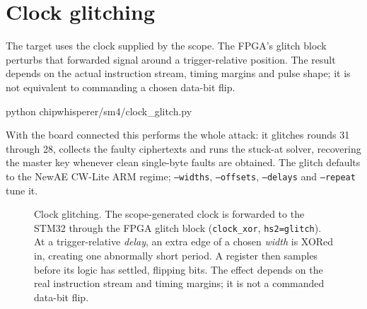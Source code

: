 \section{Clock glitching}
The target uses the clock supplied by the scope. The FPGA's glitch block perturbs that forwarded signal around a trigger-relative position. The result depends on the actual instruction stream, timing margins and pulse shape; it is not equivalent to commanding a chosen data-bit flip.
\begin{lightcode}
python chipwhisperer/sm4/clock_glitch.py
\end{lightcode}
With the board connected this performs the whole attack: it glitches rounds 31 through 28, collects the faulty ciphertexts and runs the stuck-at solver, recovering the master key whenever clean single-byte faults are obtained. The glitch defaults to the NewAE CW-Lite ARM regime; \texttt{--widths}, \texttt{--offsets}, \texttt{--delays} and \texttt{--repeat} tune it.

\begin{figure}[H]\centering
{}
\caption{Clock glitching. The scope-generated clock is forwarded to the STM32
through the FPGA glitch block (\texttt{clock\_xor}, \texttt{hs2=glitch}). At a
trigger-relative \emph{delay}, an extra edge of a chosen \emph{width} is XORed in,
creating one abnormally short period. A register then samples before its logic has
settled, flipping bits. The effect depends on the real instruction stream and
timing margins; it is not a commanded data-bit flip.}
\label{fig:clock_glitch}
\end{figure}

